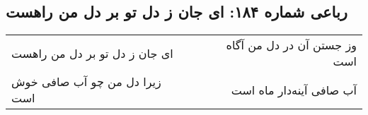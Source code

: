 \begin{center}
\section*{رباعی شماره ۱۸۴: ای جان ز دل تو بر دل من راهست}
\label{sec:0184}
\begin{longtable}{l p{0.5cm} r}
ای جان ز دل تو بر دل من راهست
&&
وز جستن آن در دل من آگاه است
\\
زیرا دل من چو آب صافی خوش است
&&
آب صافی آینه‌دار ماه است
\\
\end{longtable}
\end{center}
